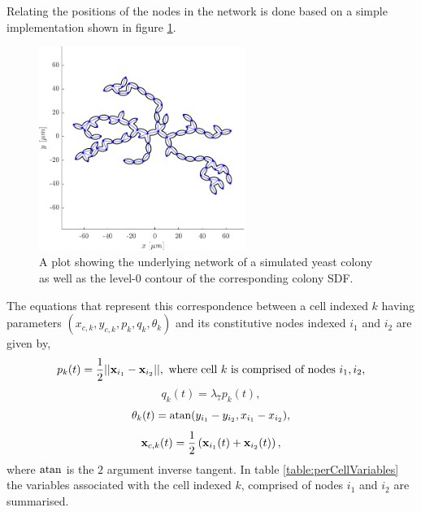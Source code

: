 Relating the positions of the nodes in the network is done 
based on a simple implementation shown in figure \ref{fig:yeastMicrograph}.
\begin{figure}[!htb]
    \centering
    \includegraphics[width=0.6\textwidth]{chapter2/figures/networkYeast.pdf}
    \caption{A plot showing the underlying network of a simulated yeast colony 
            as well as the level-$0$ contour of the corresponding colony SDF.}
    \label{fig:yeastMicrograph}
\end{figure}
The equations that represent this correspondence between a cell indexed $k$ having 
parameters $(x_{c,k}, y_{c,k}, p_k, q_k, \theta_k)$
and its constitutive nodes indexed $i_1$ and $i_2$ are given by,
\begin{equation}
    p_k(t) = \frac{1}{2}||\vb{x}_{i_1} - \vb{x}_{i_2}||, \ 
    \textrm{where cell} \ k \ \textrm{is comprised of nodes} \ i_1, i_2, 
\end{equation}
\begin{equation}
    q_k(t) = \lambda_7 p_k(t), 
\end{equation}
\begin{equation}
    \theta_k(t) = \atan (y_{i_1} - y_{i_2},x_{i_1} - x_{i_2} ), 
\end{equation}
\begin{equation}
    \vb{x}_{c,k}(t) = \frac{1}{2} \left(\vb{x}_{i_1}(t) + \vb{x}_{i_2}(t)\right),
\end{equation}
where $\atan$ is the $2$ argument inverse tangent. In table \ref{table:perCellVariables} the variables 
associated with the cell indexed $k$, comprised of nodes $i_1$ and $i_2$ are summarised.

